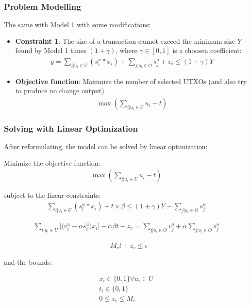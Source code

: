     \subsubsection{Problem Modelling}
      \par The same with Model 1 with some modifications:
\begin{itemize}
  \item \textbf{Constraint 1}: The size of a transaction cannot exceed the minimum size $Y$ found by Model 1 times $(1 + \gamma)$, where $\gamma \in [0, 1]$ is a choosen coefficient: 
  \begin{align*}
    y = \sum\limits_{i|u_i \in U} (s_i^u * x_i) + \sum\limits_{j|o_i \in O} s_j^o + z_s \leq (1 + \gamma) Y
  \end{align*}

  \item \textbf{Objective function}: Maximize the number of selected UTXOs (and also try to produce no change output)
  \begin{align*}
    \max(\sum\limits_{i|u_i \in U} u_i - t)
  \end{align*}
\end{itemize}


\subsubsection{Solving with Linear Optimization}
After reformulating, the model can be solved by linear optimization:

Minimize the objective function:
\begin{align*}
  \max(\sum\limits_{i|u_i \in U} u_i - t)
\end{align*}

subject to the linear constraints:
\begin{align*}
  \sum\limits_{i|u_i \in U} (s_i^u * x_i) + t \times \beta \leq (1 + \gamma) Y  - \sum\limits_{j|o_i \in O} s_j^o
\end{align*}

\begin{align*}
    \sum\limits_{i|u_i \in U} \bigg[\bigg(v_i^u - \alpha s_i^u\bigg) x_i \bigg] - \alpha \beta t - z_v
    =
    \sum\limits_{j|o_i \in O} v_j^o + \alpha \sum\limits_{j|o_i \in O} s_j^o
\end{align*}

\begin{align*}
  -M_c t + z_v \leq \epsilon
\end{align*}

and the bounds:

\begin{align*}
  x_i \in \{0, 1\} \forall u_i \in U \\
  t_i \in \{0, 1\} \\
  0 \leq z_v \leq M_c
\end{align*}

